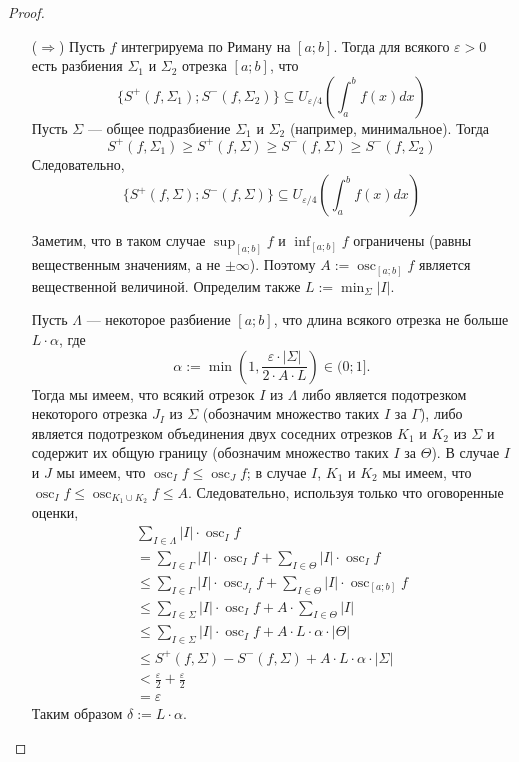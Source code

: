 \documentclass[12pt,a4paper]{article}
\DeclareMathOperator*{\osc}{osc}
\begin{document}
    \begin{proof}\ 
        \begin{itemize}
            \item[($\Rightarrow$)] Пусть $f$ интегрируема по Риману на $[a; b]$. Тогда для всякого $\varepsilon > 0$ есть разбиения $\Sigma_1$ и $\Sigma_2$ отрезка $[a; b]$, что
                \[\{S^+(f, \Sigma_1); S^-(f, \Sigma_2)\} \subseteq U_{\varepsilon/4}\left(\int_a^b f(x) dx\right)\]
                Пусть $\Sigma$ --- общее подразбиение $\Sigma_1$ и $\Sigma_2$ (например, минимальное). Тогда
                \[S^+(f, \Sigma_1) \geqslant S^+(f, \Sigma) \geqslant S^-(f, \Sigma) \geqslant S^-(f, \Sigma_2)\]
                Следовательно,
                \[\{S^+(f, \Sigma); S^-(f, \Sigma)\} \subseteq U_{\varepsilon/4}\left(\int_a^b f(x) dx\right)\]

                Заметим, что в таком случае $\sup_{[a; b]} f$ и $\inf_{[a; b]} f$ ограничены (равны вещественным значениям, а не $\pm \infty$). Поэтому $A := \osc_{[a; b]} f$ является вещественной величиной. Определим также $L := \min_\Sigma |I|$.

                Пусть $\Lambda$ --- некоторое разбиение $[a; b]$, что длина всякого отрезка не больше $L \cdot \alpha$, где
                \[\alpha := \min\left(1, \frac{\varepsilon \cdot |\Sigma|}{2 \cdot A \cdot L}\right) \in (0; 1].\]
                Тогда мы имеем, что всякий отрезок $I$ из $\Lambda$ либо является подотрезком некоторого отрезка $J_I$ из $\Sigma$ (обозначим множество таких $I$ за $\Gamma$), либо является подотрезком объединения двух соседних отрезков $K_1$ и $K_2$ из $\Sigma$ и содержит их общую границу (обозначим множество таких $I$ за $\Theta$). В случае $I$ и $J$ мы имеем, что $\osc_I f \leqslant \osc_J f$; в случае $I$, $K_1$ и $K_2$ мы имеем, что $\osc_I f \leqslant \osc_{K_1 \cup K_2} f \leqslant A$. Следовательно, используя только что оговоренные оценки,
                \begin{multline*}
                    \sum_{I \in \Lambda} |I| \cdot \osc_I f\\
                    = \sum_{I \in \Gamma} |I| \cdot \osc_I f
                        + \sum_{I \in \Theta} |I| \cdot \osc_I f\\
                    \leqslant \sum_{I \in \Gamma} |I| \cdot \osc_{J_I} f
                        + \sum_{I \in \Theta} |I| \cdot \osc_{[a; b]} f\\
                    \leqslant \sum_{I \in \Sigma} |I| \cdot \osc_{I} f
                        + A \cdot \sum_{I \in \Theta} |I|\\
                    \leqslant \sum_{I \in \Sigma} |I| \cdot \osc_{I} f
                        + A \cdot L \cdot \alpha \cdot |\Theta|\\
                    \leqslant S^+(f, \Sigma) - S^-(f, \Sigma) + A \cdot L \cdot \alpha \cdot |\Sigma|\\
                    < \frac{\varepsilon}{2} + \frac{\varepsilon}{2}\\
                    = \varepsilon
                \end{multline*}
                Таким образом $\delta := L \cdot \alpha$.
            

\end{itemize}
\end{proof}
\end{document}
